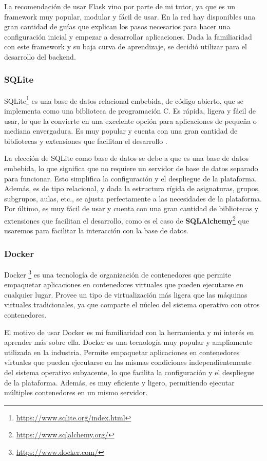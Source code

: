 La recomendación de usar Flask vino por parte de mi tutor, ya que es un framework muy popular, modular y fácil de usar. En la red hay disponibles una gran cantidad de guías que explican los pasos necesarios para hacer una configuración inicial y empezar a desarrollar aplicaciones. Dada la familiaridad con este framework y su baja curva de aprendizaje, se decidió utilizar para el desarrollo del backend.

\subsubsection*{SQLite}

SQLite\footnote{\url{https://www.sqlite.org/index.html}} es una base de datos relacional embebida, de código abierto, que se implementa como una biblioteca de programación C. Es rápida, ligera y fácil de usar, lo que la convierte en una excelente opción para aplicaciones de pequeña o mediana envergadura. Es muy popular y cuenta con una gran cantidad de bibliotecas y extensiones que facilitan el desarrollo \cite{kreibich2010using}.\newline

La elección de SQLite como base de datos se debe a que es una base de datos embebida, lo que significa que no requiere un servidor de base de datos separado para funcionar. Esto simplifica la configuración y el despliegue de la plataforma. Además, es de tipo relacional, y dada la estructura rígida de asignaturas, grupos, subgrupos, aulas, etc., se ajusta perfectamente a las necesidades de la plataforma. Por último, es muy fácil de usar y cuenta con una gran cantidad de bibliotecas y extensiones que facilitan el desarrollo, como es el caso de \textbf{SQLAlchemy}\footnote{\url{https://www.sqlalchemy.org/}} que usaremos para facilitar la interacción con la base de datos.

\subsubsection*{Docker}

Docker \footnote{\url{https://www.docker.com/}} es una tecnología de organización de contenedores que permite empaquetar aplicaciones en contenedores virtuales que pueden ejecutarse en cualquier lugar. Provee un tipo de virtualización más ligera que las máquinas virtuales tradicionales, ya que comparte el núcleo del sistema operativo con otros contenedores.\newline

El motivo de usar Docker es mi familiaridad con la herramienta y mi interés en aprender más sobre ella. Docker es una tecnología muy popular y ampliamente utilizada en la industria. Permite empaquetar aplicaciones en contenedores virtuales que pueden ejecutarse en las mismas condiciones independientemente del sistema operativo subyacente, lo que facilita la configuración y el despliegue de la plataforma. Además, es muy eficiente y ligero, permitiendo ejecutar múltiples contenedores en un mismo servidor.

